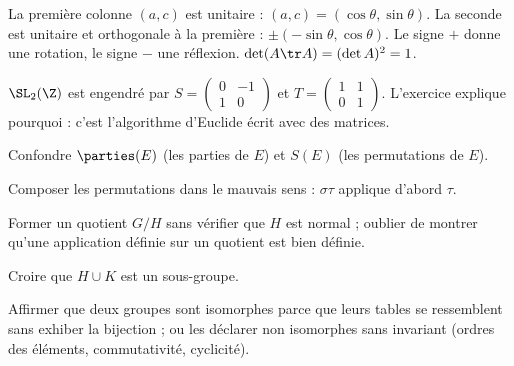 \begin{preuve}
La première colonne $(a,c)$ est unitaire : $(a,c)=(\cos\theta,\sin\theta)$. La seconde est unitaire et orthogonale à la première : $\pm(-\sin\theta,\cos\theta)$. Le signe $+$ donne une rotation, le signe $-$ une réflexion. $\det(A\tr A)=(\det A)^2=1$.
\end{preuve}
\begin{remarque}
$\SL_2(\Z)$ est engendré par $S=\begin{pmatrix}0&-1\\1&0\end{pmatrix}$ et $T=\begin{pmatrix}1&1\\0&1\end{pmatrix}$. L'exercice  explique pourquoi : c'est l'algorithme d'Euclide écrit avec des matrices.
\end{remarque}

\begin{erreurs}
\item Confondre $\parties(E)$ (les parties de $E$) et $S(E)$ (les permutations de $E$).
\item Composer les permutations dans le mauvais sens : $\sigma\tau$ applique d'abord $\tau$.
\item Former un quotient $G/H$ sans vérifier que $H$ est normal ; oublier de montrer qu'une application définie sur un quotient est bien définie.
\item Croire que $H\cup K$ est un sous-groupe.
\item Affirmer que deux groupes sont isomorphes \og parce que leurs tables se ressemblent \fg{} sans exhiber la bijection ; ou les déclarer non isomorphes sans invariant (ordres des éléments, commutativité, cyclicité).
\end{erreurs}

\exercices


